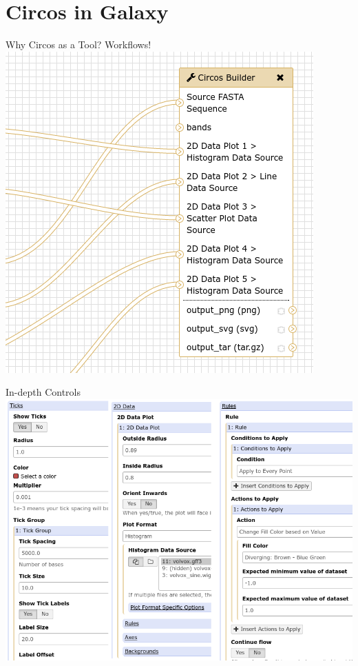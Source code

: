 \documentclass[12pt]{beamer} %
\begin{document}
\section{Circos in Galaxy}
\begin{frame}{Why Circos as a Tool? Workflows!}
	\centering
	\includegraphics[width=\textwidth,height=\textheight,keepaspectratio]{2.png}
\end{frame}

\begin{frame}{In-depth Controls}
    \centering
    \includegraphics[width=\textwidth,height=\textheight,keepaspectratio]{3.png}
\end{frame}
\end{document}

